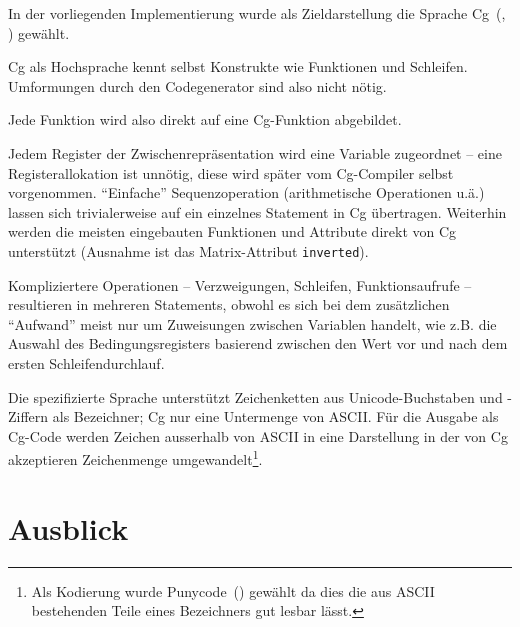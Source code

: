 \documentclass[twoside,a4paper,fleqn,12pt]{article}
\begin{document}
In der vorliegenden Implementierung wurde als Zieldarstellung die Sprache Cg~(\cite{cgpaper}, \cite{cg_home}) gewählt.

Cg als Hochsprache kennt selbst Konstrukte wie Funktionen und Schleifen. Umformungen durch den Codegenerator
sind also nicht nötig.

Jede Funktion wird also direkt auf eine Cg-Funktion abgebildet.

Jedem Register der Zwischenrepräsentation wird eine Variable zugeordnet -- eine Registerallokation ist unnötig, diese wird später vom Cg-Compiler selbst vorgenommen.
"`Einfache"' Sequenzoperation (arithmetische Operationen u.ä.) lassen sich trivialerweise auf ein einzelnes Statement in Cg übertragen. 
Weiterhin werden die meisten eingebauten Funktionen und Attribute direkt von Cg unterstützt (Ausnahme ist das Matrix-Attribut \texttt{inverted}).

Kompliziertere Operationen -- Verzweigungen, Schleifen, Funktionsaufrufe -- resultieren in mehreren Statements, obwohl es sich bei dem
zusätzlichen "`Aufwand"' meist nur um Zuweisungen zwischen Variablen handelt, wie z.B. die Auswahl des Bedingungsregisters basierend zwischen
den Wert vor und nach dem ersten Schleifendurchlauf.

Die spezifizierte Sprache unterstützt Zeichenketten aus Unicode-Buchstaben und -Ziffern als Bezeichner;
Cg nur eine Untermenge von ASCII. Für die Ausgabe als Cg-Code werden Zeichen ausserhalb von ASCII in eine Darstellung in der von Cg akzeptieren
Zeichenmenge umgewandelt\footnote{Als Kodierung wurde Punycode~(\cite{rfc3492}) gewählt da dies die aus ASCII bestehenden Teile eines Bezeichners
gut lesbar lässt.}.


\section{Ausblick}


\cleardoublepage
\appendix

\end{document}
